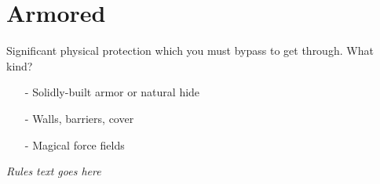 \documentclass{scrartcl}
\providecommand{\tightlist}{\setlength{\itemsep}{0pt}\setlength{\parskip}{0pt}} %
\begin{document}
	\section{Armored}
	\cardbodyfont
	Significant physical protection which you must bypass to get through. What kind?
	\cardpromptfont
	\begin{itemize}
		\tightlist
		\item[-] Solidly-built armor or natural hide
		\item[-] Walls, barriers, cover
		\item[-] Magical force fields
	\end{itemize}
	\vspace*{\fill}
	\cardrulefont
	\centering\emph{Rules text goes here}
\end{document}
